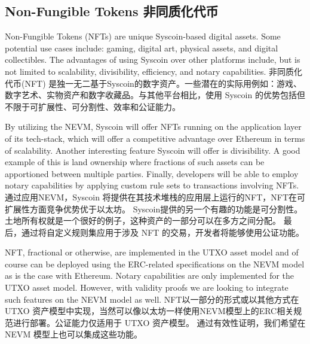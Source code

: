 \documentclass{ctexart}
\begin{document}
\subsection{Non-Fungible Tokens 非同质化代币}

Non-Fungible Tokens (NFTs) are unique Syscoin-based digital assets.  Some potential use cases include: gaming, digital art, physical assets, and digital collectibles. The advantages of using Syscoin over other platforms include, but is not limited to scalability, divisibility, efficiency, and notary capabilities. 非同质化代币(NFT) 是独一无二基于Syscoin的数字资产。一些潜在的实际用例如：游戏、数字艺术、实物资产和数字收藏品。与其他平台相比，使用 Syscoin 的优势包括但不限于可扩展性、可分割性、效率和公证能力。

By utilizing the NEVM, Syscoin will offer NFTs running on the application layer of its tech-stack, which will offer a competitive advantage over Ethereum in terms of scalability. Another interesting feature Syscoin will offer is divisibility. A good example of this is land ownership where fractions of such assets can be apportioned between multiple parties. Finally, developers will be able to employ notary capabilities by applying custom rule sets to transactions involving NFTs. 通过应用NEVM，Syscoin 将提供在其技术堆栈的应用层上运行的NFT，NFT在可扩展性方面竞争优势优于以太坊。 Syscoin提供的另一个有趣的功能是可分割性。土地所有权就是一个很好的例子，这种资产的一部分可以在多方之间分配。 最后，通过将自定义规则集应用于涉及 NFT 的交易，开发者将能够使用公证功能。

NFT, fractional or otherwise, are implemented in the UTXO asset model and of course can be deployed using the ERC-related specifications on the NEVM model as is the case with Ethereum. Notary capabilities are only implemented for the UTXO asset model. However, with validity proofs we are looking to integrate such features on the NEVM model as well. NFT以一部分的形式或以其他方式在 UTXO 资产模型中实现，当然可以像以太坊一样使用NEVM模型上的ERC相关规范进行部署。公证能力仅适用于 UTXO 资产模型。 通过有效性证明，我们希望在 NEVM 模型上也可以集成这些功能。
\end{document}
